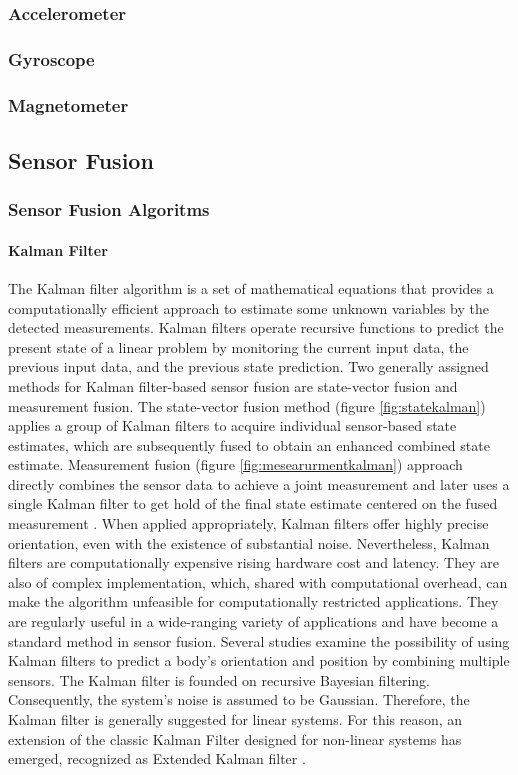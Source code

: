 \subsubsection{Accelerometer}
\subsubsection{Gyroscope}
\subsubsection{Magnetometer}
\subsection{Sensor Fusion}
\subsubsection{Sensor Fusion Algoritms}
\paragraph{Kalman Filter}

The Kalman filter algorithm is a set of mathematical equations that provides a computationally efficient approach to estimate some unknown variables by the detected measurements\cite{welch1995introduction}. Kalman filters operate recursive functions to predict the present state of a linear problem by monitoring the current input data, the previous input data, and the previous state prediction.  Two generally assigned methods for Kalman filter-based sensor fusion are state-vector fusion and measurement fusion. The state-vector fusion method (figure \ref{fig:statekalman}) applies a group of Kalman filters to acquire individual sensor-based state estimates, which are subsequently fused to obtain an enhanced combined state estimate. Measurement fusion (figure \ref{fig:mesearurmentkalman}) approach directly combines the sensor data to achieve a joint measurement and later uses a single Kalman filter to get hold of the final state estimate centered on the fused measurement \cite{mosallaei2007process}.
When applied appropriately, Kalman filters offer highly precise orientation, even with the existence of substantial noise. Nevertheless, Kalman filters are computationally expensive rising hardware cost and latency. They are also of complex implementation, which, shared with computational overhead, can make the algorithm unfeasible for computationally restricted applications. They are regularly useful in a wide-ranging variety of applications and have become a standard method in sensor fusion. Several studies examine the possibility of using Kalman filters to predict a body’s orientation and position by combining multiple sensors. The Kalman filter is founded on recursive Bayesian filtering.
Consequently, the system’s noise is assumed to be Gaussian. Therefore, the Kalman filter is generally suggested for linear systems. For this reason, an extension of the classic Kalman Filter designed for non-linear systems has emerged, recognized as Extended Kalman filter \cite{wilson2019formulation}.


